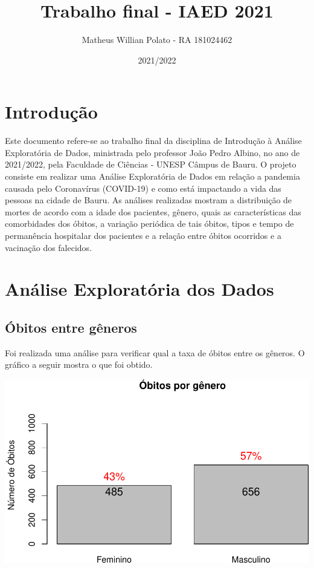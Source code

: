 \documentclass[
]{article}
\title{Trabalho final - IAED 2021}
\author{Matheus Willian Polato - RA 181024462}
\date{2021/2022}
\begin{document}
\maketitle

\hypertarget{introduuxe7uxe3o}{%
\section{Introdução}\label{introduuxe7uxe3o}}

Este documento refere-se ao trabalho final da disciplina de Introdução à
Análise Exploratória de Dados, ministrada pelo professor João Pedro
Albino, no ano de 2021/2022, pela Faculdade de Ciências - UNESP Câmpus
de Bauru. O projeto consiste em realizar uma Análise Exploratória de
Dados em relação a pandemia causada pelo Coronavírus (COVID-19) e como
está impactando a vida das pessoas na cidade de Bauru. As análises
realizadas mostram a distribuição de mortes de acordo com a idade dos
pacientes, gênero, quais as características das comorbidades dos óbitos,
a variação periódica de tais óbitos, tipos e tempo de permanência
hospitalar dos pacientes e a relação entre óbitos ocorridos e a
vacinação dos falecidos.

\hypertarget{anuxe1lise-exploratuxf3ria-dos-dados}{%
\section{Análise Exploratória dos
Dados}\label{anuxe1lise-exploratuxf3ria-dos-dados}}

\hypertarget{uxf3bitos-entre-guxeaneros}{%
\subsection{Óbitos entre gêneros}\label{uxf3bitos-entre-guxeaneros}}

Foi realizada uma análise para verificar qual a taxa de óbitos entre os
gêneros. O gráfico a seguir mostra o que foi obtido.

\includegraphics{tf-matheus-willian_files/figure-latex/unnamed-chunk-1-1.pdf}
\end{document}
